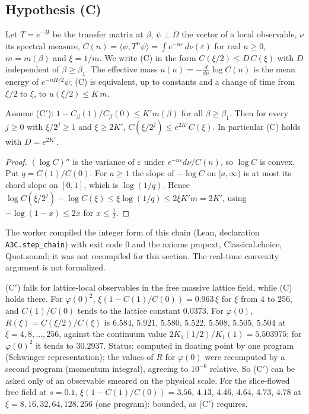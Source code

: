\subsection{Hypothesis (C)}

Let $T=e^{-H}$ be the transfer matrix at $\beta$, $\psi\perp\Omega$ the vector of a local
observable, $\nu$ its spectral measure, $C(n)=\langle\psi,T^n\psi\rangle=\int e^{-n\varepsilon}\,d\nu(\varepsilon)$
for real $n\ge0$, $m=m(\beta)$ and $\xi=1/m$. We write (C) in the form
$C(\xi/2)\le D\,C(\xi)$ with $D$ independent of $\beta\ge\beta_1$. The effective mass
$u(n)=-\frac{d}{dn}\log C(n)$ is the mean energy of $e^{-nH/2}\psi$; (C) is equivalent, up to
constants and a change of time from $\xi/2$ to $\xi$, to $u(\xi/2)\le K\,m$.

\begin{proposition}\label{neg:prop-Cprime}
Assume \textup{(C$'$)}: $1-C_\beta(1)/C_\beta(0)\le K'm(\beta)$ for all $\beta\ge\beta_1$. Then for
every $j\ge0$ with $\xi/2^j\ge1$ and $\xi\ge2K'$,
$C(\xi/2^j)\le e^{2K'}C(\xi)$. In particular (C) holds with $D=e^{2K'}$.
\end{proposition}

\begin{proof}
$(\log C)''$ is the variance of $\varepsilon$ under $e^{-n\varepsilon}d\nu/C(n)$, so $\log C$ is
convex. Put $q=C(1)/C(0)$. For $a\ge1$ the slope of $-\log C$ on $[a,\infty)$ is at most its
chord slope on $[0,1]$, which is $\log(1/q)$. Hence
$\log C(\xi/2^j)-\log C(\xi)\le\xi\log(1/q)\le2\xi K'm=2K'$, using $-\log(1-x)\le2x$ for
$x\le\frac12$.
\end{proof}

The worker compiled the integer form of this chain (Lean, declaration \texttt{A3C.step\_chain})
with exit code $0$ and the axioms propext, Classical.choice, Quot.sound; it was not recompiled
for this section. The real-time convexity argument is not formalized.

\begin{observation}\label{neg:obs-Cprime-free}
(C$'$) fails for lattice-local observables in the free massive lattice field, while (C) holds
there. For $\varphi(0)^2$, $\xi(1-C(1)/C(0))=0.963\,\xi$ for $\xi$ from $4$ to $256$, and $C(1)/C(0)$
tends to the lattice constant $0.0373$. For $\varphi(0)$, $R(\xi)=C(\xi/2)/C(\xi)$ is $6.584$,
$5.921$, $5.580$, $5.522$, $5.508$, $5.505$, $5.504$ at $\xi=4,8,\dots,256$, against the continuum
value $2K_1(1/2)/K_1(1)=5.503975$; for $\varphi(0)^2$ it tends to $30.2937$. Status: computed in
floating point by one program (Schwinger representation); the values of $R$ for $\varphi(0)$ were
recomputed by a second program (momentum integral), agreeing to $10^{-6}$ relative. So (C$'$)
can be asked only of an observable smeared on the physical scale. For the slice-flowed free
field at $s=0.1$, $\xi(1-C(1)/C(0))=3.56$, $4.13$, $4.46$, $4.64$, $4.73$, $4.78$ at
$\xi=8,16,32,64,128,256$ (one program): bounded, as (C$'$) requires.
\end{observation}

